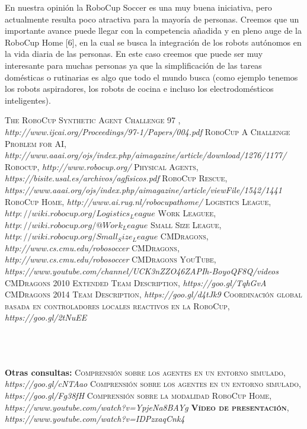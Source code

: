 \documentclass[11pt,oneside,a4paper]{book}
\begin{document}
En nuestra opinión la RoboCup Soccer es una muy buena iniciativa, pero actualmente resulta poco atractiva para la mayoría de personas. Creemos que un importante avance puede llegar con la competencia añadida y en pleno auge de la RoboCup Home [6], en la cual se busca la integración de los robots autónomos en la vida diaria de las personas. En este caso creemos que puede ser muy interesante para muchas personas ya que la simplificación de las tareas domésticas o rutinarias es algo que todo el mundo busca (como ejemplo tenemos los robots aspiradores, los robots de cocina e incluso los electrodomésticos inteligentes).



\begin{thebibliography}{a}
 \textsc{The RoboCup Synthetic Agent Challenge 97 },
\textit{http://www.ijcai.org/Proceedings/97-1/Papers/004.pdf}
 \textsc{RoboCup A Challenge Problem for AI},
\textit{http://www.aaai.org/ojs/index.php/aimagazine/article/download/1276/1177/}
 \textsc{Robocup},
\textit{http://www.robocup.org/}
 \textsc{Physical Agents},
\textit{https://bisite.usal.es/archivos/agfisicos.pdf}
 \textsc{RoboCup Rescue},
\textit{\\https://www.aaai.org/ojs/index.php/aimagazine/article/viewFile/1542/1441}
 \textsc{RoboCup Home},
\textit{http://www.ai.rug.nl/robocupathome/}
 \textsc{Logistics League},
\textit{$http://wiki.robocup.org/Logistics_League$}
 \textsc{Work Leaguee},
\textit{$http://wiki.robocup.org/@Work_League$}
 \textsc{Small Size League},
\textit{$http://wiki.robocup.org/Small_Size_League$}
 \textsc{CMDragons},
\textit{http://www.cs.cmu.edu/robosoccer}
 \textsc{CMDragons},
\textit{http://www.cs.cmu.edu/robosoccer}
 \textsc{CMDragons YouTube},
\textit{https://www.youtube.com/channel/UCK3nZZO46ZAPIh-BoyoQF8Q/videos}
 \textsc{CMDragons 2010 Extended Team Description},
\textit{https://goo.gl/TqhGvA}
 \textsc{CMDragons 2014 Team Description},
\textit{https://goo.gl/d4tJk9}
 \textsc{Coordinación global basada en controladores locales reactivos en la
RoboCup},
\textit{https://goo.gl/2tNuEE}



\newpage
\textbf{\\\\\\Otras consultas:}
 \textsc{Comprensión sobre los agentes en un entorno simulado},
\textit{https://goo.gl/cNTAao}
 \textsc{Comprensión sobre los agentes en un entorno simulado},
\textit{https://goo.gl/Fg38fH}
 \textsc{Comprensión sobre la modalidad RoboCup Home},
\textit{https://www.youtube.com/watch?v=YpjeNa8BAYg}
 \textsc{\textbf{ Vídeo de presentación}},
\textit{https://www.youtube.com/watch?v=IDPzxaqCnk4}
\end{thebibliography}
\end{document}
